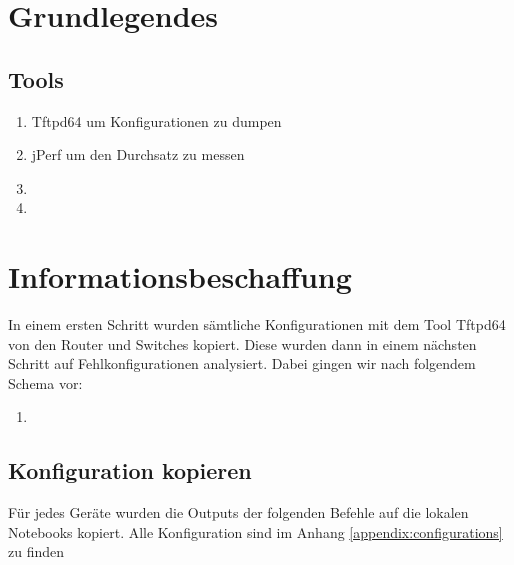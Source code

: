 

\newcommand{\SUBJECT}{Report}
\newcommand{\TITLE}{Cloud Infrastructre Lab 1}







\section{Grundlegendes}
\subsection{Tools}
\begin{enumerate}
	\item Tftpd64 um Konfigurationen zu dumpen
	\item jPerf um den Durchsatz zu messen
	\item %
	\item %
\end{enumerate}

\section{Informationsbeschaffung}
In einem ersten Schritt wurden sämtliche Konfigurationen mit dem Tool Tftpd64 von den Router und Switches kopiert. Diese wurden dann in einem nächsten Schritt auf Fehlkonfigurationen analysiert. Dabei gingen wir nach folgendem Schema vor:

\begin{enumerate}
	\item 
\end{enumerate}

\subsection{Konfiguration kopieren}
Für jedes Geräte wurden die Outputs der folgenden Befehle auf die lokalen Notebooks kopiert. Alle Konfiguration sind im Anhang \ref{appendix:configurations} zu finden

